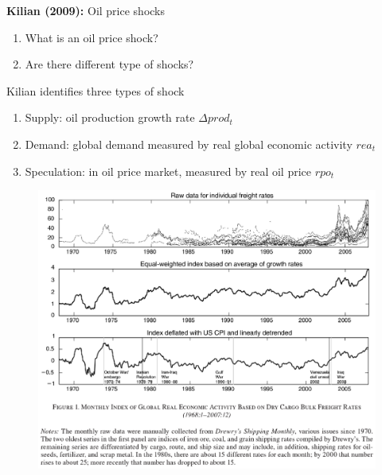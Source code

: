 \documentclass{beamer}
\begin{document}
\begin{frame}
 \textbf{Kilian (2009):} Oil price shocks\\
\begin{enumerate}
  \item What is an oil price shock?
  \item Are there different type of shocks?
\end{enumerate}
 \medskip
 Kilian identifies three types of shock
\begin{enumerate}
  \item Supply: oil production growth rate $\Delta prod_t$
  \item Demand: global demand measured by real global economic activity $rea_t$
  \item Speculation: in oil price market, measured by real oil price $rpo_t$ 
\end{enumerate}
\end{frame}

\begin{frame}
  \begin{figure}
    \includegraphics[scale=.7]{killian.eps}
  \end{figure}
\end{frame}
\end{document}
